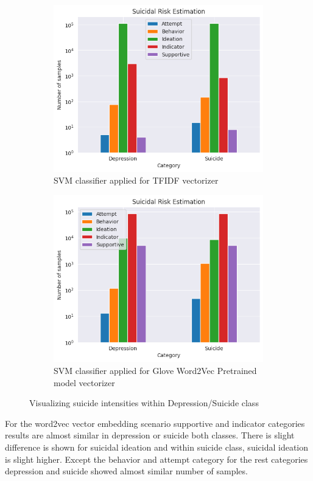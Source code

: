 \documentclass[sn-mathphys,Numbered]{sn-jnl}%
\theoremstyle{thmstyleone}%
\theoremstyle{thmstyletwo}%
\theoremstyle{thmstylethree}%
\begin{document}
\begin{figure}[H]
\centering
\begin{subfigure}{0.45\textwidth}
    \includegraphics[width=\textwidth]{grid_svm.png}
    \caption{SVM classifier applied for TFIDF vectorizer}
    \label{SVMTFIDF}
\end{subfigure}
\hfill
\begin{subfigure}{0.45\textwidth}
    \includegraphics[width=\textwidth]{glove_vec.png}
    \caption{SVM classifier applied for Glove Word2Vec Pretrained model vectorizer}
    \label{GloveWord2Vec}
\end{subfigure}        
\caption{Visualizing suicide intensities within Depression/Suicide class}
\label{Suicidal_int_vis} 
\end{figure}
For the word2vec vector embedding scenario supportive and indicator categories results are almost similar in depression or suicide both classes. There is slight difference is shown for suicidal ideation and within suicide class, suicidal ideation is slight higher. Except the behavior and attempt category for the rest categories depression and suicide showed almost similar number of samples. 
\end{document}
